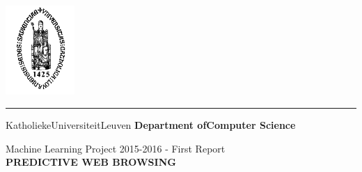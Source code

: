 \begin{titlepage}
    \newpage
    \thispagestyle{empty}
    \frenchspacing
    \hspace{-0.2cm}
    \includegraphics[height=3.4cm]{sedes}
    \hspace{0.2cm}
    \rule{0.5pt}{3.4cm}
    \hspace{0.2cm}
    \begin{minipage}[b]{8cm}
        \Large{Katholieke\newline Universiteit\newline Leuven}\smallskip\newline
        \large{}\smallskip\newline
        \textbf{Department of\newline Computer Science}\smallskip
    \end{minipage}
    \vspace*{3.2cm}\vfill
    \begin{center}
        \begin{minipage}[t]{\textwidth}
            \begin{center}
            	\Large{\rm{Machine Learning Project 2015-2016 - First Report}}\\[5mm]
                \LARGE{\rm{\textbf{\uppercase{Predictive Web Browsing}}}}
            \end{center}
        \end{minipage}
    \end{center}
    \vfill
    \hfill{}
\end{titlepage}
